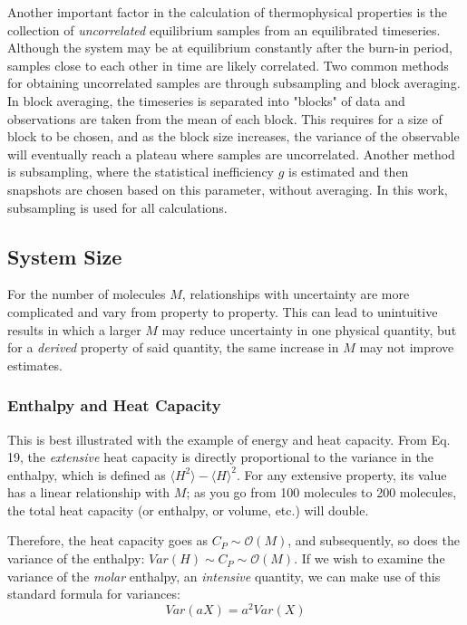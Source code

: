 \documentclass[aps,pre,twocolumn,nofootinbib,superscriptaddress,linenumbers,10pt, draft,tightenlines]{revtex4-1}
\begin{document}
Another important factor in the calculation of thermophysical properties is the collection of \emph{uncorrelated} equilibrium samples from an equilibrated timeseries.  Although the system may be at equilibrium constantly after the burn-in period, samples close to each other in time are likely correlated.  Two common methods for obtaining uncorrelated samples are through subsampling and block averaging.  In block averaging, the timeseries is separated into "blocks" of data and observations are taken from the mean of each block.  This requires for a size of block to be chosen, and as the block size increases, the variance of the observable will eventually reach a plateau where samples are uncorrelated.  Another method is subsampling, where the statistical inefficiency $g$ is estimated and then snapshots are chosen based on this parameter, without averaging.  In this work, subsampling is used for all calculations.

\subsection{System Size}
For the number of molecules $M$, relationships with uncertainty are more complicated and vary from property to property.   This can lead to unintuitive results in which a larger $M$ may reduce uncertainty in one physical quantity, but for a \emph{derived} property of said quantity, the same increase in $M$ may not improve estimates.

\subsubsection{Enthalpy and Heat Capacity}
This is best illustrated with the example of energy and heat capacity.  From Eq. 19, %
the \emph{extensive} heat capacity is directly proportional to the variance in the enthalpy, which is defined as $\langle H^2 \rangle - \langle H \rangle^2$.  For any extensive property, its value has a linear relationship with $M$; as you go from 100 molecules to 200 molecules, the total heat capacity (or enthalpy, or volume, etc.) will double.

Therefore, the heat capacity goes as $C_P \sim \mathcal{O}(M)$, and subsequently, so does the variance of the enthalpy: $ Var(H) \sim C_P \sim \mathcal{O}(M) $.  If we wish to examine the variance of the \emph{molar} enthalpy, an \emph{intensive} quantity, we can make use of this standard formula for variances:
\begin{equation}
Var(aX)=a^2Var(X)
\end{equation}
\end{document}
